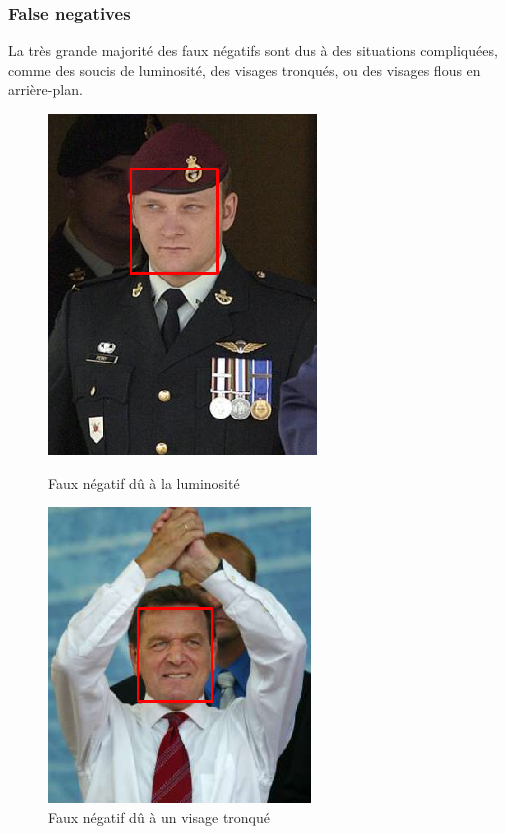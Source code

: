 \documentclass[a4paper,11pt]{article}
\begin{document}
\subsubsection{False negatives}

La très grande majorité des faux négatifs sont dus à des situations compliquées, comme des soucis de luminosité, des visages tronqués, ou des visages flous en arrière-plan.\\

\begin{figure}[H]
    \centering
    \begin{minipage}[c]{0.45\linewidth}
        \begin{center}
            \includegraphics[scale=0.45]{facenetFN1.png}
            \caption{Faux négatif dû à la luminosité}
        \end{center}
    \end{minipage} \hfill
    \begin{minipage}[c]{0.45\linewidth}
        \begin{center}
            \includegraphics[scale=0.525]{facenetFN2.png}
            \caption{Faux négatif dû à un visage tronqué}
        \end{center}
    \end{minipage}
\end{figure}
\end{document}
